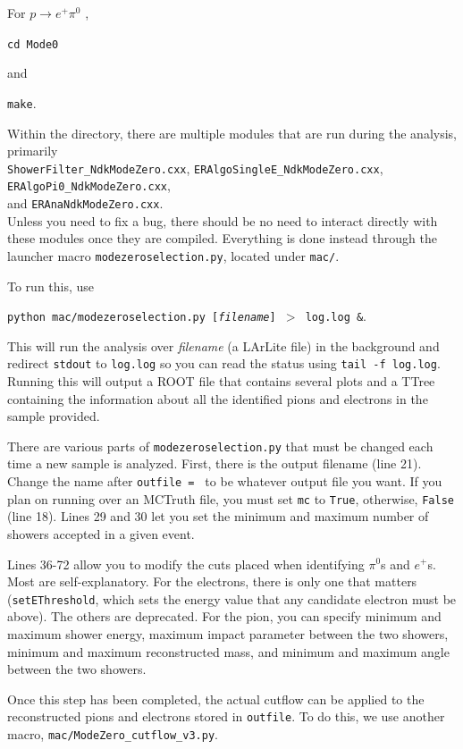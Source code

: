 \documentclass[a4paper, 10pt]{article}
\begin{document}
\newpage

\noindent
For $p \rightarrow e^{+} \pi^{0}$ , 

\texttt{cd Mode0}

\noindent
and

\texttt{make}.

Within the directory, there are multiple modules that are run during the analysis, primarily\\
 \texttt{ShowerFilter\_NdkModeZero.cxx}, \texttt{ERAlgoSingleE\_NdkModeZero.cxx}, \texttt{ERAlgoPi0\_NdkModeZero.cxx}, \\ and \texttt{ERAnaNdkModeZero.cxx}. \\
Unless you need to fix a bug, there should be no need to interact directly with these modules once they are compiled. Everything is done instead through the launcher macro \texttt{modezeroselection.py}, located under \texttt{mac/}.

To run this, use

\texttt{python mac/modezeroselection.py [\textit{filename}] $>$ log.log \&}.

\noindent
This will run the analysis over \textit{filename} (a LArLite file) in the background and redirect \texttt{stdout} to \texttt{log.log} so you can read the status using \texttt{tail -f log.log}. Running this will output a ROOT file that contains several plots and a TTree containing the information about all the identified pions and electrons in the sample provided.

There are various parts of \texttt{modezeroselection.py} that must be changed each time a new sample is analyzed. First, there is the output filename (line 21). Change the name after \texttt{outfile = } to be whatever output file you want. If you plan on running over an MCTruth file, you must set \texttt{mc} to \texttt{True}, otherwise, \texttt{False} (line 18). Lines 29 and 30 let you set the minimum and maximum number of showers accepted in a given event.

Lines 36-72 allow you to modify the cuts placed when identifying $\pi^{0}$s and $e^+$s. Most are self-explanatory. For the electrons, there is only one that matters (\texttt{setEThreshold}, which sets the energy value that any candidate electron must be above). The others are deprecated. For the pion, you can specify minimum and maximum shower energy, maximum impact parameter between the two showers, minimum and maximum reconstructed mass, and minimum and maximum angle between the two showers.

Once this step has been completed, the actual cutflow can be applied to the reconstructed pions and electrons stored in \texttt{outfile}. To do this, we use another macro, \texttt{mac/ModeZero\_cutflow\_v3.py}.
\end{document}
